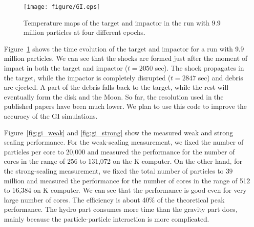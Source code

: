 
\begin{figure}
  \begin{center}
    \texttt{[image: figure/GI.eps]}
  \end{center}
  \caption{Temperature maps of the target and impactor in the run with
  $9.9$ million particles at four different epochs. }
  \label{fig:evolutionGI}
\end{figure}

Figure~\ref{fig:evolutionGI} shows the time evolution of the target
and impactor for a run with 9.9 million particles. We can see that the
shocks are formed just after the moment of impact in both the target
and impactor ($t=2050$ sec). The shock propagates in the target, while
the impactor is completely disrupted ($t=2847$ sec) and debris are
ejected. A part of the debris falls back to the target, while the rest
will eventually form the disk and the Moon. So far, the resolution
used in the published papers have been much lower. We plan to use this
code to improve the accuracy of the GI simulations.

Figure~\ref{fig:gi_weak} and \ref{fig:gi_strong} show the measured
weak and strong scaling performance. For the weak-scaling measurement,
we fixed the number of particles per core to 20,000 and measured the
performance for the number of cores in the range of 256 to 131,072 on
the K computer. On the other hand, for the strong-scaling measurement,
we fixed the total number of particles to $39$ million and measured
the performance for the number of cores in the range of 512 to 16,384
on K computer. We can see that the performance is good even for very
large number of cores. The efficiency is about 40\% of the theoretical
peak performance. The hydro part consumes more time than the gravity
part does, mainly because the particle-particle interaction is more
complicated.


